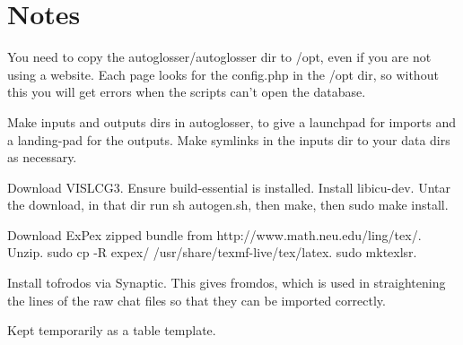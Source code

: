 \documentclass[a4paper,10pt]{article}
\begin{document}
{\section{Notes}

You need to copy the autoglosser/autoglosser dir to /opt, even if you are not using a website.  Each page looks for the config.php in the /opt dir, so without this you will get errors when the scripts can't open the database.

Make inputs and outputs dirs in autoglosser, to give a launchpad for imports and a landing-pad for the outputs.  Make symlinks in the inputs dir to your data dirs as necessary.

Download VISLCG3.  Ensure build-essential is installed. Install libicu-dev.  Untar the download, in that dir run sh autogen.sh, then make, then sudo make install.

Download ExPex zipped bundle from http://www.math.neu.edu/ling/tex/.  Unzip.  sudo cp -R expex/ /usr/share/texmf-live/tex/latex.  sudo mktexlsr.

Install tofrodos via Synaptic.  This gives fromdos, which is used in straightening the lines of the raw chat files so that they can be imported correctly.



\newpage


Kept temporarily as a table template.

}
\end{document}
